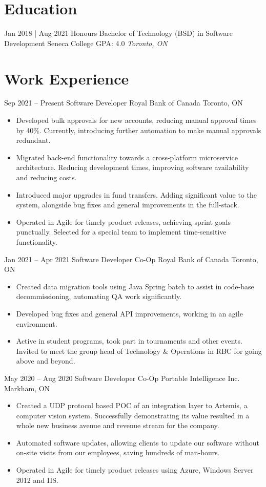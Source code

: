 \documentclass[letterpaper]{moderncv}
\begin{document}
\makecvtitle
    

\section{Education}
\cventry
{Jan 2018 | Aug 2021}
{Honours Bachelor of Technology (BSD) in Software Development}
{Seneca College}
{GPA: 4.0}
{\textit{Toronto, ON}}
{}
\section{Work Experience}
\cventry
{Sep 2021 -- Present}
{Software Developer}
{Royal Bank of Canada}
{Toronto, ON}
{}
{\begin{itemize}%
	\item Developed bulk approvals for new accounts, reducing manual approval times by 40\%. Currently, introducing further automation to make manual approvals redundant.
	\item Migrated back-end functionality towards a cross-platform microservice architecture. Reducing development times, improving software availability and reducing costs.
	\item Introduced major upgrades in fund transfers. Adding significant value to the system, alongside bug fixes and general improvements in the full-stack. 
	\item Operated in Agile for timely product releases, achieving sprint goals punctually. Selected for a special team to implement time-sensitive functionality.
	\end{itemize}}
\cventry
{Jan 2021 -- Apr 2021}
{Software Developer Co-Op}
{Royal Bank of Canada}
{Toronto, ON}
{}
{\begin{itemize}%
	\item Created data migration tools using Java Spring batch to assist in code-base decommissioning, automating QA work significantly.
	\item Developed bug fixes and general API improvements, working in an agile environment.
	\item Active in student programs, took part in tournaments and other events. Invited to meet the group head of Technology \& Operations in RBC for going above and beyond.
	\end{itemize}}
\cventry
{May 2020 -- Aug 2020}
{Software Developer Co-Op}
{Portable Intelligence Inc.}
{Markham, ON}
{}
{\begin{itemize}%
	\item Created a UDP protocol based POC of an integration layer to Artemis, a computer vision system. Successfully demonstrating its value resulted in a whole new business avenue and revenue stream for the company.
	\item Automated software updates, allowing clients to update our software without on-site visits from our employees, saving hundreds of man-hours.
	\item Operated in Agile for timely product releases using Azure, Windows Server 2012 and IIS.
	\end{itemize}}
\end{document}

